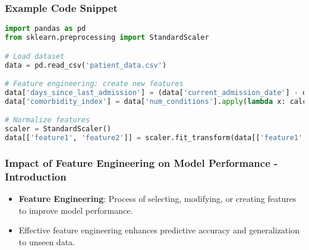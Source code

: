 \documentclass[aspectratio=169]{beamer}
\begin{document}
\begin{frame}[fragile]
    \frametitle{Example Code Snippet}
    \begin{lstlisting}[language=python]
import pandas as pd
from sklearn.preprocessing import StandardScaler

# Load dataset
data = pd.read_csv('patient_data.csv')

# Feature engineering: create new features
data['days_since_last_admission'] = (data['current_admission_date'] - data['last_admission_date']).dt.days
data['comorbidity_index'] = data['num_conditions'].apply(lambda x: calculate_comorbidity_index(x))

# Normalize features
scaler = StandardScaler()
data[['feature1', 'feature2']] = scaler.fit_transform(data[['feature1', 'feature2']])
    \end{lstlisting}
\end{frame}

\begin{frame}[fragile]
    \frametitle{Impact of Feature Engineering on Model Performance - Introduction}
    \begin{itemize}
        \item \textbf{Feature Engineering}: Process of selecting, modifying, or creating features to improve model performance.
        \item Effective feature engineering enhances predictive accuracy and generalization to unseen data.
    \end{itemize}
\end{frame}
\end{document}
